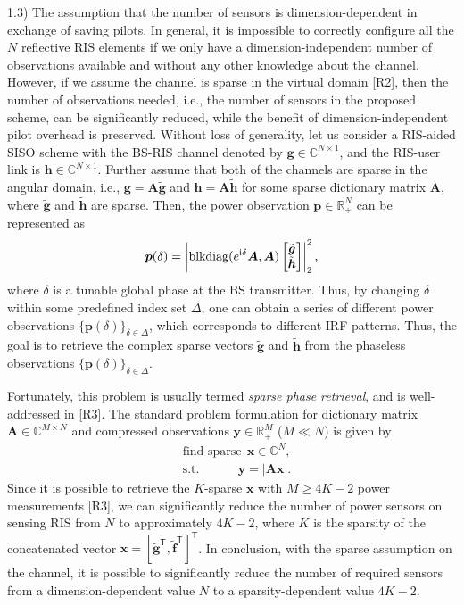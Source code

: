 \documentclass[a4paper,12pt]{article}
\def \T {^{\mathsf{T}}}
\def \ri {{\rm i}}
\begin{document}
{{1.3) The assumption that the number of sensors is dimension-dependent in exchange of saving pilots. In general, it is impossible to correctly configure all the $N$ reflective RIS elements if we only have a dimension-independent number of observations available and without any other knowledge about the channel. However, if we assume the channel is sparse in the virtual domain [R2], then the number of observations needed, i.e., the number of sensors in the proposed scheme, can be significantly reduced, while the benefit of dimension-independent pilot overhead is preserved. Without loss of generality, let us consider a RIS-aided SISO scheme with the BS-RIS channel denoted by ${\bm g}\in\mathbb{C}^{N\times 1}$, and the RIS-user link is ${\bm h}\in\mathbb{C}^{N\times 1}$. Further assume that both of the channels are sparse in the angular domain, i.e., ${\bm g} = {\bm A}\tilde{\bm g}$ and ${\bm h} = {\bm A}\tilde{\bm h}$ for some sparse dictionary matrix ${\bm A}$, where $\tilde{\bm g}$ and $\tilde{\bm h}$ are sparse. Then, the power observation ${\bm p}\in\mathbb{R}_{+}^N$ can be represented as 
\begin{equation}
    {\bm p}(\delta) = \left|{\rm blkdiag}(e^{\ri \delta}{\bm A}, {\bm A}) \begin{bmatrix} \tilde{\bm g} \\ \tilde{\bm h}\end{bmatrix} \right|_2^2,
\end{equation}
where $\delta$ is a tunable global phase at the BS transmitter. Thus, by changing $\delta$ within some predefined index set $\Delta$, one can obtain a series of different power observations $\{{\bm p}(\delta)\}_{\delta\in\Delta}$, which corresponds to different IRF patterns. 
Thus, the goal is to retrieve the complex sparse vectors $\tilde{\bm g}$ and $\tilde{\bm h}$ from the phaseless observations $\{{\bm p}(\delta)\}_{\delta\in\Delta}$. 

Fortunately, this problem is usually termed {\it sparse phase retrieval}, and is well-addressed in [R3]. The standard problem formulation for dictionary matrix ${\bm A}\in\mathbb{C}^{M\times N}$ and compressed observations ${\bm y}\in\mathbb{R}_{+}^{M}$ ($M\ll N$) is given by  
\begin{equation}
    \begin{aligned}
        &{\text{find sparse}}~~{\bm x\in\mathbb{C}^N},\\
        &{\text{s.t.}}~~~~~~~~~~~~~~{\bm y} = \left|{\bm A}{\bm x}\right|.
    \end{aligned}
\end{equation}
Since it is possible to retrieve the $K$-sparse ${\bm x}$ with $M\geq 4K-2$ power measurements [R3], we can significantly reduce the number of power sensors on sensing RIS from $N$ to approximately $4K-2$, where $K$ is the sparsity of the concatenated vector ${\bm x} = [\tilde{\bm g}\T, \tilde{\bm f}\T]\T$. In conclusion, with the sparse assumption on the channel, it is possible to significantly reduce the number of required sensors from a dimension-dependent value $N$ to a sparsity-dependent value $4K-2$. 

}}
\end{document}
